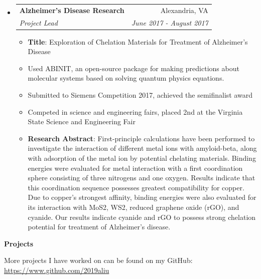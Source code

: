 \documentclass[letterpaper,11pt]{article}
\makeatletter
\newcommand{\resitem}[1]{\item #1 \vspace{-2pt}}
\newcommand{\resheading}[1]{{\large \colorbox{mygrey}{\begin{minipage}{\textwidth}{\textbf{#1 \vphantom{p\^{E}}}}\end{minipage}}}}
\newcommand{\ressubheading}[4]{
\begin{tabular*}{7.0in}{l@{\extracolsep{\fill}}r}
		\textbf{#1} & #2 \\
		\textit{#3} & \textit{#4} \\
\end{tabular*}\vspace{-6pt}}
\makeatother
\begin{document}
\begin{itemize}
\begin{itemize}
	\end{itemize}
\item
	\ressubheading{Alzheimer's Disease Research}{Alexandria, VA}{Project Lead}{June 2017 - August 2017}
	\begin{itemize}
	    \resitem{\textbf{Title}: Exploration of Chelation Materials for Treatment of Alzheimer's Disease}
		\resitem{Used ABINIT, an open-source package for making predictions about molecular systems based on solving quantum physics equations.}
		\resitem{Submitted to Siemens Competition 2017, achieved the semifinalist award}
		\resitem{Competed in science and engineering fairs, placed 2nd at the Virginia State Science and Engineering Fair}
		\resitem{\textbf{Research Abstract}: \scriptsize{First-principle calculations have been performed to investigate the interaction of different metal ions with amyloid-beta, along with adsorption of the metal ion by potential chelating materials. Binding energies were evaluated for metal interaction with a first coordination sphere consisting of three nitrogens and one oxygen. Results indicate that this coordination sequence possesses greatest compatibility for copper. Due to copper's strongest affinity, binding energies were also evaluated for its interaction with MoS2, WS2, reduced graphene oxide (rGO), and cyanide. Our results indicate cyanide and rGO to possess strong chelation potential for treatment of Alzheimer's disease.}}
	\end{itemize}
\end{itemize}


\resheading{Projects}

\vspace{1em}
More projects I have worked on can be found on my GitHub: \url{https://www.github.com/2019aliu}
\end{document}
